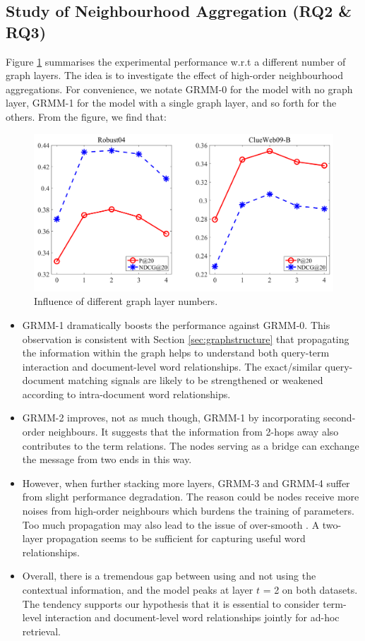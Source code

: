 \subsection{Study of Neighbourhood Aggregation (RQ2 \& RQ3)}
\label{sec:neighbouraggre}
Figure \ref{fig:4} summarises the experimental performance w.r.t a different number of graph layers. The idea is to investigate the effect of high-order neighbourhood aggregations. For convenience, we notate GRMM-0 for the model with no graph layer, GRMM-1 for the model with a single graph layer, and so forth for the others. From the figure, we find that:

\begin{figure}[h]
	\centering
	\includegraphics[width=.47\textwidth]{./pics/num_of_layers.png}
	\caption{Influence of different graph layer numbers.}
	\label{fig:4} 
\end{figure}

\begin{itemize}
	\item GRMM-1 dramatically boosts the performance against GRMM-0. This observation is consistent with Section \ref{sec:graphstructure} that propagating the information within the graph helps to understand both query-term interaction and document-level word relationships. The exact/similar query-document matching signals are likely to be strengthened or weakened according to intra-document word relationships. 
	\item GRMM-2 improves, not as much though, GRMM-1 by incorporating second-order neighbours. It suggests that the information from 2-hops away also contributes to the term relations. The nodes serving as a bridge can exchange the message from two ends in this way.
	\item However, when further stacking more layers, GRMM-3 and GRMM-4 suffer from slight performance degradation. The reason could be nodes receive more noises from high-order neighbours which burdens the training of parameters. Too much propagation may also lead to the issue of over-smooth \cite{kipf2017semi}. A two-layer propagation seems to be sufficient for capturing useful word relationships.
	\item Overall, there is a tremendous gap between using and not using the contextual information, and the model peaks at layer $t$ = 2 on both datasets. The tendency supports our hypothesis that it is essential to consider term-level interaction and document-level word relationships jointly for ad-hoc retrieval. 
\end{itemize}

